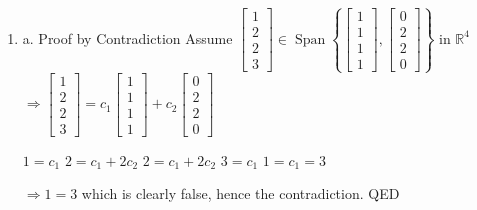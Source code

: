 \documentclass[11pt]{article}
\begin{document}
\begin{enumerate}[{\bf Q1.}]
	\item 
	\begin{enumerate}
		a. Proof by Contradiction
Assume $\left[\begin{array}{l}1 \\ 2 \\ 2 \\ 3\end{array}\right] \in \operatorname{Span}\left\{\left[\begin{array}{l}1 \\ 1 \\ 1 \\ 1\end{array}\right],\left[\begin{array}{l}0 \\ 2 \\ 2 \\ 0\end{array}\right]\right\}$ in $\mathbb{R}^4$ \newline
		$\Rightarrow \left[\begin{array}{l}1 \\ 2 \\ 2 \\ 3\end{array}\right]=c_1\left[\begin{array}{l}1 \\ 1 \\ 1 \\ 1\end{array}\right]+c_2\left[\begin{array}{l}0 \\ 2 \\ 2 \\ 0\end{array}\right]$ \newline
		\newline
		\begin{center}
			$1=c_1$ \newline
			$2=c_1+2 c_2$ \newline
			$2=c_1+2 c_2$ \newline
			$3=c_1$ \newline
			$1=c_1=3$ \newline
		\end{center}

		$\Rightarrow 1=3$ which is clearly false, hence the contradiction.
		QED
		

\end{enumerate}
\end{enumerate}
\end{document}
